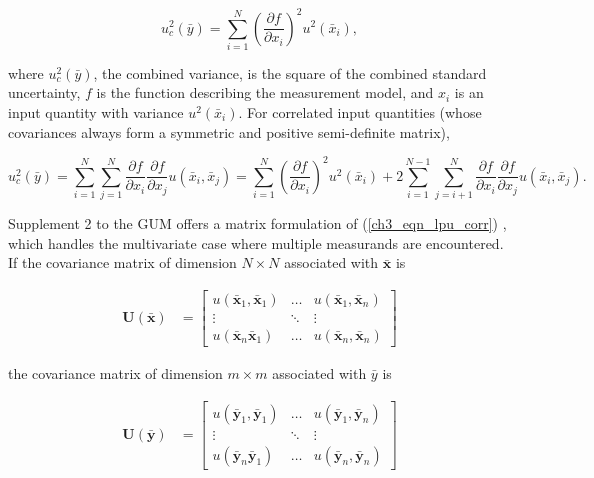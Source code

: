 \documentclass[../thesis/thesis.tex]{subfiles}
\begin{document}
\begin{refsection}
\begin{equation}
u^2_c(\bar{y}) = \sum_{i=1}^{N}(\frac{\partial f}{\partial x_i})^2 u^2(\bar{x}_i),
\end{equation}

where $u^2_c(\bar{y})$, the combined variance, is the square of the combined standard uncertainty, $f$ is the function describing the measurement model, and $x_i$ is an input quantity with variance $u^2(\bar{x}_i)$. For correlated input quantities (whose covariances always form a symmetric and positive semi-definite matrix),

\begin{equation}
u^2_c(\bar{y}) = \sum_{i=1}^{N}\sum_{j=1}^{N} \frac{\partial f}{\partial x_i}\frac{\partial f}{\partial x_j} u(\bar{x}_i,\bar{x}_j) = \sum_{i=1}^{N}(\frac{\partial f}{\partial x_i})^2 u^2(\bar{x}_i) + 2\sum_{i=1}^{N-1}\sum_{j=i+1}^{N} \frac{\partial f}{\partial x_i}\frac{\partial f}{\partial x_j} u(\bar{x}_i,\bar{x}_j).
\label{ch3_eqn_lpu_corr}
\end{equation}

Supplement 2 to the GUM offers a matrix formulation of (\ref{ch3_eqn_lpu_corr}) \cite[6.2.1.3]{GUM_S2}, which handles the multivariate case where multiple measurands are encountered. If the covariance matrix of dimension $N \times N$ associated with $\bar{\bm{x}}$ is

\begin{align}
\boldsymbol U(\bar{\boldsymbol x}) & = 
\begin{bmatrix}
u{(\bar{\boldsymbol x}_1,\bar{\boldsymbol x}_1)}&\dots&u(\bar{\boldsymbol x}_1,\bar{\boldsymbol x}_n)\\
\vdots&\ddots&\vdots\\
u(\bar{\boldsymbol x}_n\bar{\boldsymbol x}_1)&\dots&u{(\bar{\boldsymbol x}_n,\bar{\boldsymbol x}_n)}
\end{bmatrix}
\end{align}

the covariance matrix of dimension $m \times m$ associated with $\bar y$ is

\begin{align}
\boldsymbol U(\bar{\boldsymbol y}) & = 
\begin{bmatrix}
u{(\bar{\boldsymbol y}_1,\bar{\boldsymbol y}_1)}&\dots&u(\bar{\boldsymbol y}_1,\bar{\boldsymbol y}_n)\\
\vdots&\ddots&\vdots\\
u(\bar{\boldsymbol y}_n\bar{\boldsymbol y}_1)&\dots&u{(\bar{\boldsymbol y}_n,\bar{\boldsymbol y}_n)}
\end{bmatrix}
\end{align}


\end{refsection}
\end{document}
